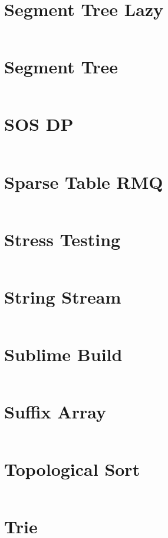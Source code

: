 \documentclass[10pt,a4paper,landscape]{article}
\begin{document}
\begin{multicols*}{3}
		\section{Segment Tree Lazy}
		\inputminted{cpp}{codes/SEGMENT_TREE_LAZY.cpp}
		
		\section{Segment Tree}
		\inputminted{cpp}{codes/SEGMENT_TREE.cpp}
		
		\section{SOS DP}
		\inputminted{cpp}{codes/SOS_DP.cpp}
		
		\section{Sparse Table RMQ}
		\inputminted{cpp}{codes/SPARSE_TABLE_RMQ.cpp}
		
		\section{Stress Testing}
		\inputminted{cpp}{codes/STRESS_TESTING.cpp}
		
		\section{String Stream}
		\inputminted{cpp}{codes/STRINGSTREAM.cpp}
		
		\section{Sublime Build}
		\inputminted{cpp}{codes/SUBLIME_BUILD.cpp}
		
		\section{Suffix Array}
		\inputminted{cpp}{codes/SUFFIX_ARRAY.cpp}
		
		\section{Topological Sort}
		\inputminted{cpp}{codes/TOPOLOGICAL_SORT.cpp}
		
		\section{Trie}
		\inputminted{cpp}{codes/TRIE.cpp}
		

\end{multicols*}
\end{document}
